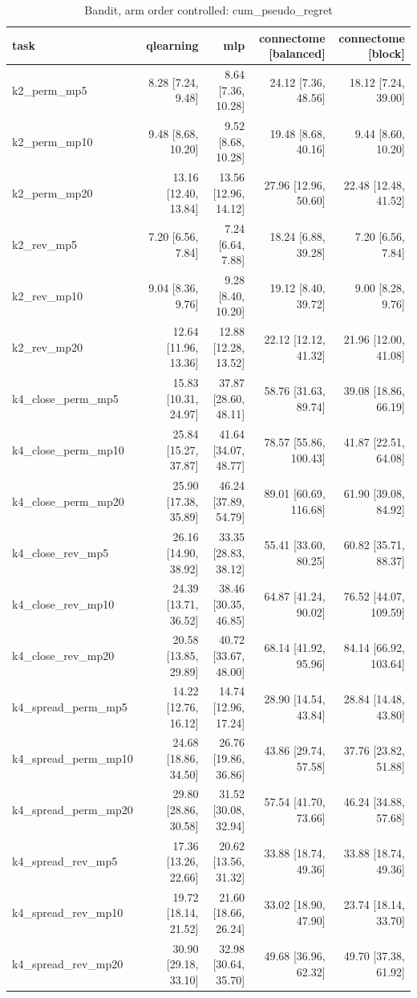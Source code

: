 \begin{table}[t]
\centering
\small
\begin{tabular}{lrrrr}
\toprule
task & qlearning & mlp & connectome [balanced] & connectome [block] \\
\midrule
k2\_perm\_mp5 & 8.28 [7.24, 9.48] & 8.64 [7.36, 10.28] & 24.12 [7.36, 48.56] & 18.12 [7.24, 39.00] \\
k2\_perm\_mp10 & 9.48 [8.68, 10.20] & 9.52 [8.68, 10.28] & 19.48 [8.68, 40.16] & 9.44 [8.60, 10.20] \\
k2\_perm\_mp20 & 13.16 [12.40, 13.84] & 13.56 [12.96, 14.12] & 27.96 [12.96, 50.60] & 22.48 [12.48, 41.52] \\
k2\_rev\_mp5 & 7.20 [6.56, 7.84] & 7.24 [6.64, 7.88] & 18.24 [6.88, 39.28] & 7.20 [6.56, 7.84] \\
k2\_rev\_mp10 & 9.04 [8.36, 9.76] & 9.28 [8.40, 10.20] & 19.12 [8.40, 39.72] & 9.00 [8.28, 9.76] \\
k2\_rev\_mp20 & 12.64 [11.96, 13.36] & 12.88 [12.28, 13.52] & 22.12 [12.12, 41.32] & 21.96 [12.00, 41.08] \\
k4\_close\_perm\_mp5 & 15.83 [10.31, 24.97] & 37.87 [28.60, 48.11] & 58.76 [31.63, 89.74] & 39.08 [18.86, 66.19] \\
k4\_close\_perm\_mp10 & 25.84 [15.27, 37.87] & 41.64 [34.07, 48.77] & 78.57 [55.86, 100.43] & 41.87 [22.51, 64.08] \\
k4\_close\_perm\_mp20 & 25.90 [17.38, 35.89] & 46.24 [37.89, 54.79] & 89.01 [60.69, 116.68] & 61.90 [39.08, 84.92] \\
k4\_close\_rev\_mp5 & 26.16 [14.90, 38.92] & 33.35 [28.83, 38.12] & 55.41 [33.60, 80.25] & 60.82 [35.71, 88.37] \\
k4\_close\_rev\_mp10 & 24.39 [13.71, 36.52] & 38.46 [30.35, 46.85] & 64.87 [41.24, 90.02] & 76.52 [44.07, 109.59] \\
k4\_close\_rev\_mp20 & 20.58 [13.85, 29.89] & 40.72 [33.67, 48.00] & 68.14 [41.92, 95.96] & 84.14 [66.92, 103.64] \\
k4\_spread\_perm\_mp5 & 14.22 [12.76, 16.12] & 14.74 [12.96, 17.24] & 28.90 [14.54, 43.84] & 28.84 [14.48, 43.80] \\
k4\_spread\_perm\_mp10 & 24.68 [18.86, 34.50] & 26.76 [19.86, 36.86] & 43.86 [29.74, 57.58] & 37.76 [23.82, 51.88] \\
k4\_spread\_perm\_mp20 & 29.80 [28.86, 30.58] & 31.52 [30.08, 32.94] & 57.54 [41.70, 73.66] & 46.24 [34.88, 57.68] \\
k4\_spread\_rev\_mp5 & 17.36 [13.26, 22.66] & 20.62 [13.56, 31.32] & 33.88 [18.74, 49.36] & 33.88 [18.74, 49.36] \\
k4\_spread\_rev\_mp10 & 19.72 [18.14, 21.52] & 21.60 [18.66, 26.24] & 33.02 [18.90, 47.90] & 23.74 [18.14, 33.70] \\
k4\_spread\_rev\_mp20 & 30.90 [29.18, 33.10] & 32.98 [30.64, 35.70] & 49.68 [36.96, 62.32] & 49.70 [37.38, 61.92] \\
\bottomrule
\end{tabular}
\caption{Bandit, arm order controlled: cum\_pseudo\_regret}
\label{tab:bandit_perm_cum_pseudo_regret}
\end{table}